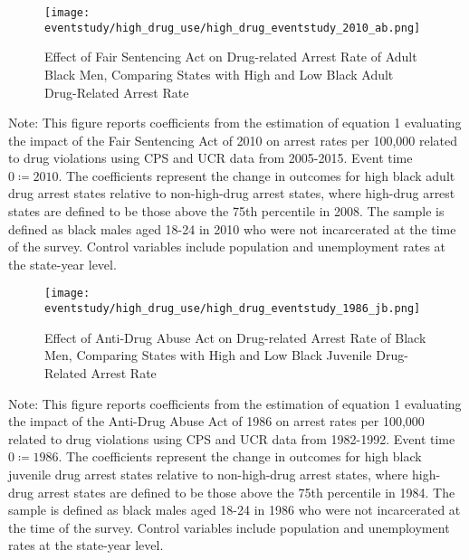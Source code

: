   
  
  
  \begin{figure}[h]
    \caption{Effect of Fair Sentencing Act on Drug-related Arrest Rate of Adult Black Men, Comparing States with High and Low Black Adult Drug-Related Arrest Rate}
    \centering
    \texttt{[image: eventstudy/high\_drug\_use/high\_drug\_eventstudy\_2010\_ab.png]}
    \label{fig:ab_es_2010}
  \end{figure}
  
  \begin{footnotesize}
    \noindent Note: This figure reports coefficients from the estimation of equation 1 evaluating the impact of the Fair Sentencing Act of 2010 on arrest rates per 100,000 related to drug violations using CPS and UCR data from 2005-2015. Event time $0 \coloneqq 2010$. The coefficients represent the change in outcomes for high black adult drug arrest states relative to non-high-drug arrest states, where high-drug arrest states are defined to be those above the 75th percentile in 2008. The sample is defined as black males aged 18-24 in 2010 who were not incarcerated at the time of the survey. Control variables include population and unemployment rates at the state-year level. 
  \end{footnotesize}

\clearpage

  \begin{figure}[h]
    \caption{Effect of Anti-Drug Abuse Act on Drug-related Arrest Rate of Black Men, Comparing States with High and Low Black Juvenile Drug-Related Arrest Rate}
    \centering
    \texttt{[image: eventstudy/high\_drug\_use/high\_drug\_eventstudy\_1986\_jb.png]}
    \label{fig:jb_es_1986}
  \end{figure}

  \begin{footnotesize}
    \noindent Note: This figure reports coefficients from the estimation of equation 1 evaluating the impact of the Anti-Drug Abuse Act of 1986 on arrest rates per 100,000 related to drug violations using CPS and UCR data from 1982-1992. Event time $0 \coloneqq 1986$. The coefficients represent the change in outcomes for high black juvenile drug arrest states relative to non-high-drug arrest states, where high-drug arrest states are defined to be those above the 75th percentile in 1984. The sample is defined as black males aged 18-24 in 1986 who were not incarcerated at the time of the survey. Control variables include population and unemployment rates at the state-year level. 
  \end{footnotesize}

